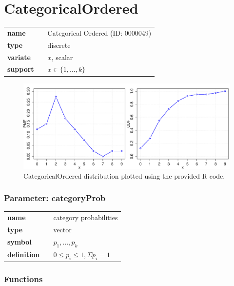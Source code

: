 \section*{CategoricalOrdered} 

  \bigskip 

\begin{tabular}{p{2cm}cl}
\textbf{name} & & Categorical Ordered (ID: 0000049)\\ 
 
\textbf{type} & & discrete \\ 

\textbf{variate} & & $x$, scalar \\ 

\textbf{support} & & $x \in \{1,\dots,k\}$
\end{tabular}

\begin{figure}[ht!]
\centering
  \includegraphics[width=140mm]{pics/CategoricalOrdered.pdf}
 \caption{CategoricalOrdered distribution plotted using the provided R code.}
 \label{fig:CategoricalOrdered}
\end{figure}

\subsubsection*{Parameter: categoryProb}

\noindent\begin{tabular}{p{2cm}cl}
\textbf{name} & & category probabilities \\
\textbf{type} & & vector \\
\textbf{symbol} & & $p_1, \ldots, p_k$  \\
\textbf{definition} & & $0 \leq p_i \leq 1, \Sigma p_i = 1$
\end{tabular}
\subsubsection*{Functions}

